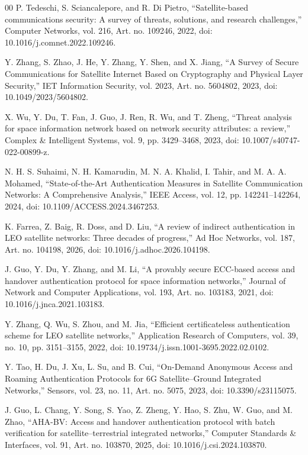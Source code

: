\documentclass[conference]{IEEEtran}
\begin{document}
\begin{thebibliography}{00}
P. Tedeschi, S. Sciancalepore, and R. Di Pietro, ``Satellite-based communications security: A survey of threats, solutions, and research challenges,'' Computer Networks, vol. 216, Art. no. 109246, 2022, doi: 10.1016/j.comnet.2022.109246.

Y. Zhang, S. Zhao, J. He, Y. Zhang, Y. Shen, and X. Jiang, ``A Survey of Secure Communications for Satellite Internet Based on Cryptography and Physical Layer Security,'' IET Information Security, vol. 2023, Art. no. 5604802, 2023, doi: 10.1049/2023/5604802.

X. Wu, Y. Du, T. Fan, J. Guo, J. Ren, R. Wu, and T. Zheng, ``Threat analysis for space information network based on network security attributes: a review,'' Complex \& Intelligent Systems, vol. 9, pp. 3429--3468, 2023, doi: 10.1007/s40747-022-00899-z.


 N. H. S. Suhaimi, N. H. Kamarudin, M. N. A. Khalid, I. Tahir, and M. A. A. Mohamed, ``State-of-the-Art Authentication Measures in Satellite Communication Networks: A Comprehensive Analysis,'' IEEE Access, vol. 12, pp. 142241--142264, 2024, doi: 10.1109/ACCESS.2024.3467253.

K. Farrea, Z. Baig, R. Doss, and D. Liu, ``A review of indirect authentication in LEO satellite networks: Three decades of progress,'' Ad Hoc Networks, vol. 187, Art. no. 104198, 2026, doi: 10.1016/j.adhoc.2026.104198.

J. Guo, Y. Du, Y. Zhang, and M. Li, ``A provably secure ECC-based access and handover authentication protocol for space information networks,'' Journal of Network and Computer Applications, vol. 193, Art. no. 103183, 2021, doi: 10.1016/j.jnca.2021.103183.

Y. Zhang, Q. Wu, S. Zhou, and M. Jia, ``Efficient certificateless authentication scheme for LEO satellite networks,'' Application Research of Computers, vol. 39, no. 10, pp. 3151--3155, 2022, doi: 10.19734/j.issn.1001-3695.2022.02.0102.

Y. Tao, H. Du, J. Xu, L. Su, and B. Cui, ``On-Demand Anonymous Access and Roaming Authentication Protocols for 6G Satellite--Ground Integrated Networks,'' Sensors, vol. 23, no. 11, Art. no. 5075, 2023, doi: 10.3390/s23115075.

J. Guo, L. Chang, Y. Song, S. Yao, Z. Zheng, Y. Hao, S. Zhu, W. Guo, and M. Zhao, ``AHA-BV: Access and handover authentication protocol with batch verification for satellite--terrestrial integrated networks,'' Computer Standards \& Interfaces, vol. 91, Art. no. 103870, 2025, doi: 10.1016/j.csi.2024.103870.


\end{thebibliography}
\end{document}
